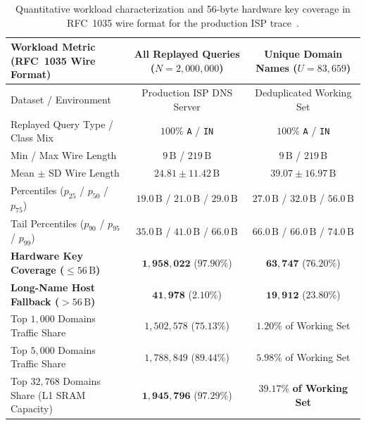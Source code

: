 \documentclass[a4paper,fleqn,colorlinks,hidelinks]{cas-sc}
\begin{document}
\begin{table}[htbp]
\centering
\small
\caption{Quantitative workload characterization and 56-byte hardware key coverage in RFC~1035 wire format for the production ISP trace~\citep{11314363}.}
\label{tab:trace_characterization}
\begin{tabular}{@{}lcc@{}}
\toprule
\textbf{Workload Metric (RFC~1035 Wire Format)} & \textbf{All Replayed Queries ($N = 2{,}000{,}000$)} & \textbf{Unique Domain Names ($U = 83{,}659$)} \\
\midrule
Dataset / Environment & Production ISP DNS Server & Deduplicated Working Set \\
Replayed Query Type / Class Mix & $100\%$ \texttt{A} / \texttt{IN} & $100\%$ \texttt{A} / \texttt{IN} \\
Min / Max Wire Length & $9\,\text{B}$ / $219\,\text{B}$ & $9\,\text{B}$ / $219\,\text{B}$ \\
Mean $\pm$ SD Wire Length & $24.81 \pm 11.42\,\text{B}$ & $39.07 \pm 16.97\,\text{B}$ \\
Percentiles ($p_{25}$ / $p_{50}$ / $p_{75}$) & $19.0\,\text{B}$ / $21.0\,\text{B}$ / $29.0\,\text{B}$ & $27.0\,\text{B}$ / $32.0\,\text{B}$ / $56.0\,\text{B}$ \\
Tail Percentiles ($p_{90}$ / $p_{95}$ / $p_{99}$) & $35.0\,\text{B}$ / $41.0\,\text{B}$ / $66.0\,\text{B}$ & $66.0\,\text{B}$ / $66.0\,\text{B}$ / $74.0\,\text{B}$ \\
\midrule
\textbf{Hardware Key Coverage ($\le 56\,\text{B}$)} & $\mathbf{1{,}958{,}022}$ ($\mathbf{97.90\%}$) & $\mathbf{63{,}747}$ ($\mathbf{76.20\%}$) \\
\textbf{Long-Name Host Fallback ($> 56\,\text{B}$)} & $\mathbf{41{,}978}$ ($\mathbf{2.10\%}$) & $\mathbf{19{,}912}$ ($\mathbf{23.80\%}$) \\
\midrule
Top $1{,}000$ Domains Traffic Share & $1{,}502{,}578$ ($75.13\%$) & $1.20\%$ of Working Set \\
Top $5{,}000$ Domains Traffic Share & $1{,}788{,}849$ ($89.44\%$) & $5.98\%$ of Working Set \\
Top $32{,}768$ Domains Share (L1 SRAM Capacity) & $\mathbf{1{,}945{,}796}$ ($\mathbf{97.29\%}$) & $\mathbf{39.17\%}$ \textbf{of Working Set} \\
\bottomrule
\end{tabular}
\end{table}
\end{document}

